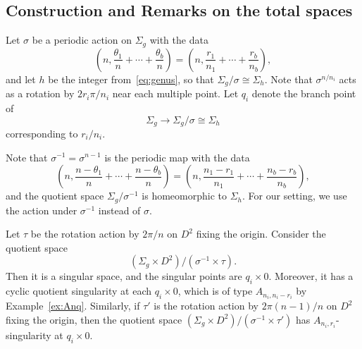 \documentclass[10pt,a4paper,reqno]{amsart}
\theoremstyle{definition}
\numberwithin{equation}{section}
\numberwithin{figure}{section}
\newcommand{\arrowr}{\rightarrow}
\begin{document}
%
%
%


\subsection{Construction and Remarks on the total spaces}
Let $\sigma$ be a periodic action on $\Sigma_g$ with the data 
\[\left(n,\frac{\theta_1}{n}+\cdots+\frac{\theta_b}{n}\right)=\left(n, \frac{r_1}{n_1}+\cdots +\frac{r_b}{n_b}\right),\]
and let $h$ be the integer from~\eqref{eq:genus}, so that $\Sigma_g/\sigma \cong \Sigma_h$.
Note that $\sigma^{n/n_i}$ acts as a rotation by $2r_i \pi /n_i$ near each multiple point.
Let $q_i$ denote the branch point of \[\Sigma_g \arrowr \Sigma_g/\sigma\cong\Sigma_h\] corresponding to $r_i/n_i$.

Note that $\sigma^{-1}=\sigma^{n-1}$ is the periodic map with the data
\[\left(n,\frac{n-\theta_1}{n}+\cdots+\frac{n-\theta_b}{n}\right)=\left(n, \frac{n_1-r_1}{n_1}+\cdots +\frac{n_b-r_b}{n_b}\right),\]
and the quotient space $\Sigma_g/\sigma^{-1}$ is homeomorphic to $\Sigma_h$.
For our setting, we use the action under $\sigma^{-1}$ instead of $\sigma$.

Let $\tau$ be the rotation action by $2\pi/n$ on $D^2$ fixing the origin.
Consider the quotient space \[(\Sigma_g \times D^2)/(\sigma^{-1}\times \tau).\]
Then it is a singular space, and the singular points are $q_i\times 0$.
Moreover, it has a cyclic quotient singularity at each $q_i \times 0$, which is of type $A_{n_i, n_i-r_i}$ by Example~\ref{ex:Anq}.
Similarly, if $\tau'$ is the rotation action by $2\pi (n-1)/n$ on $D^2$ fixing the origin,
then the quotient space $(\Sigma_g \times D^2)/(\sigma^{-1}\times \tau')$ has $A_{n_i, r_i}$-singularity at $q_i \times 0$.
\end{document}
